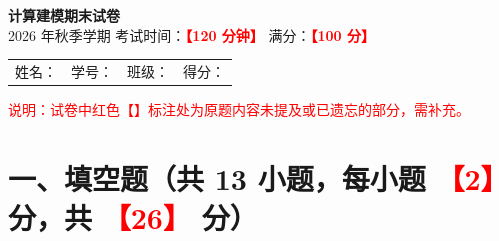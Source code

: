\documentclass[12pt,a4paper,UTF8,fontset=fandol]{ctexart}
\newcommand{\ph}[1]{\textcolor{red}{\textbf{【#1】}}}
\begin{document}
\begin{center}
{\LARGE \textbf{计算建模期末试卷}}\\[0.8em]
{\large 2026 年秋季学期 \quad 考试时间：\ph{120 分钟} \quad 满分：\ph{100 分}}
\end{center}

\vspace{0.5em}
\begin{center}
\renewcommand{\arraystretch}{2.0}
\begin{tabular}{p{}p{}p{}p{}}
姓名：\underline{\hspace{1.8cm}} & 学号：\underline{\hspace{1.8cm}} & 班级：\underline{\hspace{1.8cm}} & 得分：\underline{\hspace{1.3cm}}
\end{tabular}
\end{center}

\vspace{0.5em}
\noindent\textcolor{red}{说明：试卷中红色【】标注处为原题内容未提及或已遗忘的部分，需补充。}

\section*{一、填空题（共 13 小题，每小题 \ph{2} 分，共 \ph{26} 分）}
\end{document}
